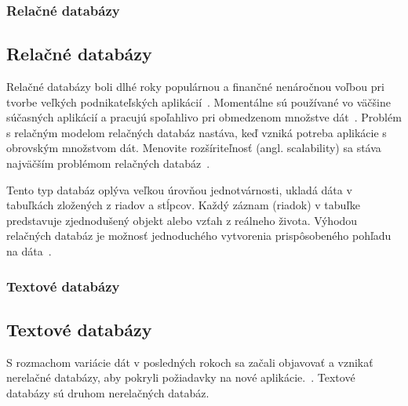 %
%
{
	\subsubsection{Relačné databázy}
}
{
	\subsection{Relačné databázy}
}
\label{subsubsection:relation_dbs}
Relačné databázy boli dlhé roky populárnou a finančné nenáročnou voľbou pri tvorbe veľkých podnikateľských aplikácií~\cite{MongoDBvsMySQLCompared}. Momentálne sú používané vo väčšine súčasných aplikácií a pracujú spoľahlivo pri obmedzenom množstve dát~\cite{MongoDBvsMySQL2015}. Problém s relačným modelom relačných databáz nastáva, keď vzniká potreba aplikácie s obrovským množstvom dát. Menovite rozšíriteľnosť (angl. scalability) sa stáva najväčším problémom relačných databáz~\cite{NoSQLDBvsRealtionDB}.

Tento typ databáz oplýva veľkou úrovňou jednotvárnosti, ukladá dáta v tabuľkách zložených z riadov a stĺpcov. Každý záznam (riadok) v tabuľke predstavuje zjednodušený objekt alebo vzťah z reálneho života. Výhodou relačných databáz je možnosť jednoduchého vytvorenia prispôsobeného pohľadu na dáta~\cite{Maier}.

%
%
{
	\subsubsection{Textové databázy}
}
{
	\subsection{Textové databázy}
}
\label{subsubsection:text_dbs}
S rozmachom variácie dát v posledných rokoch sa začali objavovať a vznikať nerelačné databázy, aby pokryli požiadavky na nové aplikácie.~\cite{MongoDBvsMySQLCompared}. Textové databázy sú druhom nerelačných databáz.

